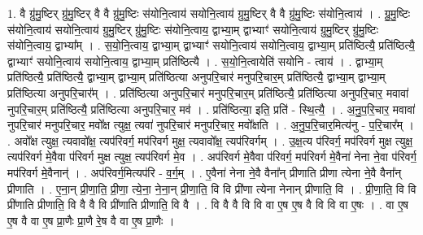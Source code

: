 \documentclass[17pt]{extarticle}
\begin{document}
1. वै ग्रु॑मु॒ष्टिर् ग्रु॑मु॒ष्टिर् वै वै ग्रु॑मु॒ष्टिः स॑योनि॒त्वाय॑ सयोनि॒त्वाय॑ ग्रुमु॒ष्टिर् वै वै ग्रु॑मु॒ष्टिः स॑योनि॒त्वाय॑ । . ग्रु॒मु॒ष्टिः स॑योनि॒त्वाय॑ सयोनि॒त्वाय॑ ग्रुमु॒ष्टिर् ग्रु॑मु॒ष्टिः स॑योनि॒त्वाय॒ द्वाभ्या॒म् द्वाभ्याꣳ॑ सयोनि॒त्वाय॑ ग्रुमु॒ष्टिर् ग्रु॑मु॒ष्टिः स॑योनि॒त्वाय॒ द्वाभ्या᳚म् । . स॒यो॒नि॒त्वाय॒ द्वाभ्या॒म् द्वाभ्याꣳ॑ सयोनि॒त्वाय॑ सयोनि॒त्वाय॒ द्वाभ्या॒म् प्रति॑ष्ठित्यै॒ प्रति॑ष्ठित्यै॒ द्वाभ्याꣳ॑ सयोनि॒त्वाय॑ सयोनि॒त्वाय॒ द्वाभ्या॒म् प्रति॑ष्ठित्यै । . स॒यो॒नि॒त्वायेति॑ सयोनि - त्वाय॑ । . द्वाभ्या॒म् प्रति॑ष्ठित्यै॒ प्रति॑ष्ठित्यै॒ द्वाभ्या॒म् द्वाभ्या॒म् प्रति॑ष्ठित्या अनुपरि॒चार॑ मनुपरि॒चार॒म् प्रति॑ष्ठित्यै॒ द्वाभ्या॒म् द्वाभ्या॒म् प्रति॑ष्ठित्या अनुपरि॒चार᳚म् । . प्रति॑ष्ठित्या अनुपरि॒चार॑ मनुपरि॒चार॒म् प्रति॑ष्ठित्यै॒ प्रति॑ष्ठित्या अनुपरि॒चार॒ मवावा॑ नुपरि॒चार॒म् प्रति॑ष्ठित्यै॒ प्रति॑ष्ठित्या अनुपरि॒चार॒ मव॑ । . प्रति॑ष्ठित्या॒ इति॒ प्रति॑ - स्थि॒त्यै॒ । . अ॒नु॒प॒रि॒चार॒ मवावा॑ नुपरि॒चार॑ मनुपरि॒चार॒ मवो᳚क्ष त्युक्ष॒ त्यवा॑ नुपरि॒चार॑ मनुपरि॒चार॒ मवो᳚क्षति । . अ॒नु॒प॒रि॒चार॒मित्य॑नु - प॒रि॒चार᳚म् । . अवो᳚क्ष त्युक्ष॒ त्यवावो᳚क्ष॒ त्यप॑रिवर्ग॒ मप॑रिवर्ग मुक्ष॒ त्यवावो᳚क्ष॒ त्यप॑रिवर्गम् । . उ॒क्ष॒त्य प॑रिवर्ग॒ मप॑रिवर्ग मुक्ष त्युक्ष॒ त्यप॑रिवर्ग मे॒वैवा प॑रिवर्ग मुक्ष त्युक्ष॒ त्यप॑रिवर्ग मे॒व । . अप॑रिवर्ग मे॒वैवा प॑रिवर्ग॒ मप॑रिवर्ग मे॒वैना॑ नेना ने॒वा प॑रिवर्ग॒ मप॑रिवर्ग मे॒वैनान्॑ । . अप॑रिवर्ग॒मित्यप॑रि - व॒र्ग॒म् । . ए॒वैना॑ नेना ने॒वै वैना᳚न् प्रीणाति प्रीणा त्येना ने॒वै वैना᳚न् प्रीणाति । . ए॒ना॒न् प्री॒णा॒ति॒ प्री॒णा॒ त्ये॒ना॒ ने॒ना॒न् प्री॒णा॒ति॒ वि वि प्री॑णा त्येना नेनान् प्रीणाति॒ वि । . प्री॒णा॒ति॒ वि वि प्री॑णाति प्रीणाति॒ वि वै वै वि प्री॑णाति प्रीणाति॒ वि वै । . वि वै वै वि वि वा ए॒ष ए॒ष वै वि वि वा ए॒षः । . वा ए॒ष ए॒ष वै वा ए॒ष प्रा॒णैः प्रा॒णै रे॒ष वै वा ए॒ष प्रा॒णैः । \newline
\end{document}

